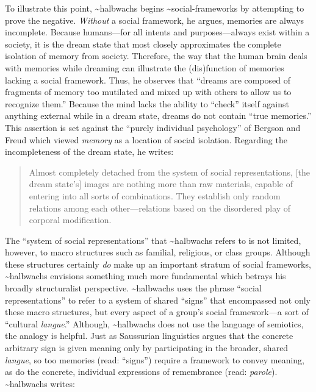 To illustrate this point, \textasciitilde{}halbwachs begins
\textasciitilde{}social-frameworks by attempting to prove the negative.
\emph{Without} a social framework, he argues, memories are always
incomplete. Because humans---for all intents and purposes---always exist
within a society, it is the dream state that most closely approximates
the complete isolation of memory from society. Therefore, the way that
the human brain deals with memories while dreaming can illustrate the
(dis)function of memories lacking a social framework. Thus, he observes
that ``dreams are composed of fragments of memory too mutilated and
mixed up with others to allow us to recognize
them.''\autocite[41]{halbwachs1992} Because the mind lacks the ability
to ``check'' itself against anything external while in a dream state,
dreams do not contain ``true memories.''\autocite[41]{halbwachs1992}
This assertion is set against the ``purely individual psychology'' of
Bergson and Freud which viewed \emph{memory} as a location of social
isolation.\autocites[See][]{ansellpearson_radstone-schwarz2011}[and][]{terdiman_radstone-schwarz2011}
Regarding the incompleteness of the dream state, he writes:

\begin{quote}
Almost completely detached from the system of social representations,
{[}the dream state's{]} images are nothing more than raw materials,
capable of entering into all sorts of combinations. They establish only
random relations among each other---relations based on the disordered
play of corporal modification.\autocite[42]{halbwachs1992}
\end{quote}

The ``system of social representations'' that \textasciitilde{}halbwachs
refers to is not limited, however, to macro structures such as familial,
religious, or class groups. Although these structures certainly
\emph{do} make up an important stratum of social frameworks,
\textasciitilde{}halbwachs envisions something much more fundamental
which betrays his broadly structuralist perspective.
\textasciitilde{}halbwachs uses the phrase ``social representations'' to
refer to a system of shared ``signs'' that encompassed not only these
macro structures, but every aspect of a group's social framework---a
sort of ``cultural \emph{langue}.'' Although, \textasciitilde{}halbwachs
does not use the language of semiotics, the analogy is helpful. Just as
Saussurian linguistics argues that the concrete arbitrary sign is given
meaning only by participating in the broader, shared \emph{langue}, so
too memories (read: ``signs'') require a framework to convey meaning, as
do the concrete, individual expressions of remembrance (read:
\emph{parole}). \textasciitilde{}halbwachs writes:


